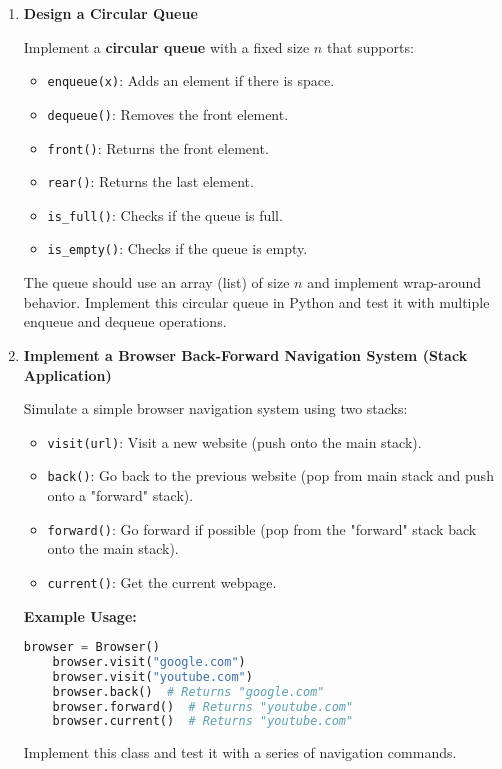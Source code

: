 \documentclass{article}
\begin{document}
\begin{enumerate}
    \item \textbf{Design a Circular Queue}
    
    Implement a \textbf{circular queue} with a fixed size $n$ that supports:
    \begin{itemize}
        \item \texttt{enqueue(x)}: Adds an element if there is space.
        \item \texttt{dequeue()}: Removes the front element.
        \item \texttt{front()}: Returns the front element.
        \item \texttt{rear()}: Returns the last element.
        \item \texttt{is\_full()}: Checks if the queue is full.
        \item \texttt{is\_empty()}: Checks if the queue is empty.
    \end{itemize}
    The queue should use an array (list) of size $n$ and implement wrap-around behavior.
    Implement this circular queue in Python and test it with multiple enqueue and dequeue operations.
    
    \item \textbf{Implement a Browser Back-Forward Navigation System (Stack Application)}
    
    Simulate a simple browser navigation system using two stacks:
    \begin{itemize}
        \item \texttt{visit(url)}: Visit a new website (push onto the main stack).
        \item \texttt{back()}: Go back to the previous website (pop from main stack and push onto a "forward" stack).
        \item \texttt{forward()}: Go forward if possible (pop from the "forward" stack back onto the main stack).
        \item \texttt{current()}: Get the current webpage.
    \end{itemize}
    
    \textbf{Example Usage:}
    \begin{lstlisting}[language=Python]
    browser = Browser()
    browser.visit("google.com")
    browser.visit("youtube.com")
    browser.back()  # Returns "google.com"
    browser.forward()  # Returns "youtube.com"
    browser.current()  # Returns "youtube.com"
    \end{lstlisting}
    Implement this class and test it with a series of navigation commands.

\end{enumerate}
\end{document}
